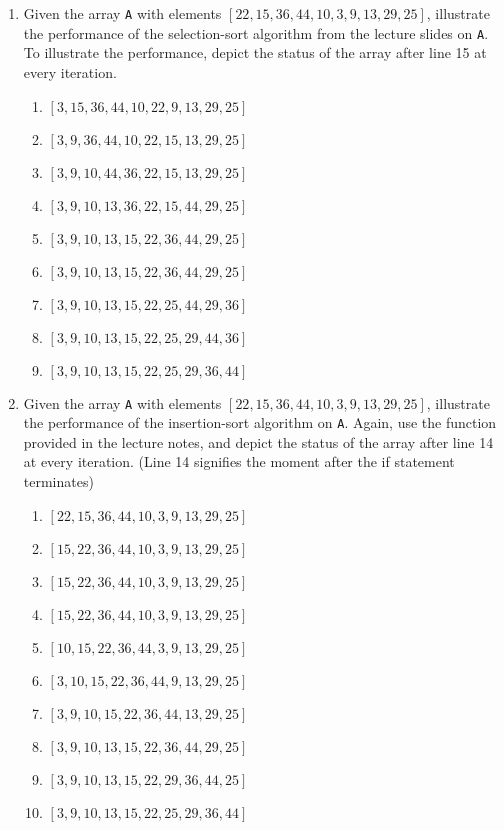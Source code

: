 \documentclass[11pt]{article}
\begin{document}
\begin{enumerate}
        \item Given the array \verb|A| with elements $[22, 15, 36, 44, 10, 3, 9, 13, 29, 25]$, illustrate the performance of the selection-sort algorithm from the lecture slides on \verb|A|. To illustrate the performance, depict the status of the array after line 15 at every iteration.
        \begin{enumerate}[label=(i:{\arabic*}),start=0]
            \item $[3, 15, 36, 44, 10, 22, 9, 13, 29, 25]$
            \item $[3, 9, 36, 44, 10, 22, 15, 13, 29, 25]$
            \item $[3, 9, 10, 44, 36, 22, 15, 13, 29, 25]$
            \item $[3, 9, 10, 13, 36, 22, 15, 44, 29, 25]$
            \item $[3, 9, 10, 13, 15, 22, 36, 44, 29, 25]$
            \item $[3, 9, 10, 13, 15, 22, 36, 44, 29, 25]$
            \item $[3, 9, 10, 13, 15, 22, 25, 44, 29, 36]$
            \item $[3, 9, 10, 13, 15, 22, 25, 29, 44, 36]$
            \item $[3, 9, 10, 13, 15, 22, 25, 29, 36, 44]$
        \end{enumerate}

        \item Given the array \verb|A| with elements $[22, 15, 36, 44, 10, 3, 9, 13, 29, 25]$, illustrate the performance of the insertion-sort algorithm on \verb|A|. Again, use the function provided in the lecture notes, and depict the status of the array after line 14 at every iteration. (Line 14 signifies the moment after the if statement terminates)
        \begin{enumerate}[label=(i:{\arabic*}), start=0]
            \item $[22, 15, 36, 44, 10, 3, 9, 13, 29, 25]$
            \item $[15, 22, 36, 44, 10, 3, 9, 13, 29, 25]$
            \item $[15, 22, 36, 44, 10, 3, 9, 13, 29, 25]$
            \item $[15, 22, 36, 44, 10, 3, 9, 13, 29, 25]$
            \item $[10, 15, 22, 36, 44, 3, 9, 13, 29, 25]$
            \item $[3, 10, 15, 22, 36, 44, 9, 13, 29, 25]$
            \item $[3, 9, 10, 15, 22, 36, 44, 13, 29, 25]$
            \item $[3, 9, 10, 13, 15, 22, 36, 44, 29, 25]$
            \item $[3, 9, 10, 13, 15, 22, 29, 36, 44, 25]$
            \item $[3, 9, 10, 13, 15, 22, 25, 29, 36, 44]$
        \end{enumerate}


\end{enumerate}
\end{document}
